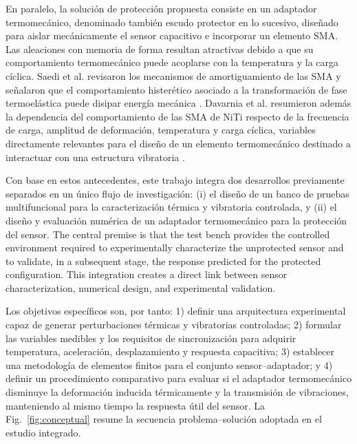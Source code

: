 \documentclass[conference]{IEEEtran}
\begin{document}
En paralelo, la solución de protección propuesta consiste en un adaptador termomecánico, denominado también escudo protector en lo sucesivo, diseñado para aislar mecánicamente el sensor capacitivo e incorporar un elemento SMA. Las aleaciones con memoria de forma resultan atractivas debido a que su comportamiento termomecánico puede acoplarse con la temperatura y la carga cíclica. Saedi et al. revisaron los mecanismos de amortiguamiento de las SMA y señalaron que el comportamiento histerético asociado a la transformación de fase termoelástica puede disipar energía mecánica \cite{Saedi2023}. Davarnia et al. resumieron además la dependencia del comportamiento de las SMA de NiTi respecto de la frecuencia de carga, amplitud de deformación, temperatura y carga cíclica, variables directamente relevantes para el diseño de un elemento termomecánico destinado a interactuar con una estructura vibratoria \cite{Davarnia2025}.

Con base en estos antecedentes, este trabajo integra dos desarrollos previamente separados en un único flujo de investigación: (i) el diseño de un banco de pruebas multifuncional para la caracterización térmica y vibratoria controlada, y (ii) el diseño y evaluación numérica de un adaptador termomecánico para la protección del sensor. The central premise is that the test bench provides the controlled environment required to experimentally characterize the unprotected sensor and to validate, in a subsequent stage, the response predicted for the protected configuration. This integration creates a direct link between sensor characterization, numerical design, and experimental validation.

Los objetivos específicos son, por tanto: 1) definir una arquitectura experimental capaz de generar perturbaciones térmicas y vibratorias controladas; 2) formular las variables medibles y los requisitos de sincronización para adquirir temperatura, aceleración, desplazamiento y respuesta capacitiva; 3) establecer una metodología de elementos finitos para el conjunto sensor--adaptador; y 4) definir un procedimiento comparativo para evaluar si el adaptador termomecánico disminuye la deformación inducida térmicamente y la transmisión de vibraciones, manteniendo al mismo tiempo la respuesta útil del sensor. La Fig.~\ref{fig:conceptual} resume la secuencia problema--solución adoptada en el estudio integrado.

\end{document}
